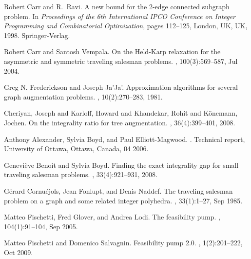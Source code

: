 \documentclass[runningheads]{llncs}
\begin{document}
%
%
%
% 
% 
%
\begin{thebibliography}{10}
	
	
	
	Robert Carr and R.~Ravi.
	\newblock A new bound for the 2-edge connected subgraph problem.
	\newblock In {\em Proceedings of the 6th International IPCO Conference on
		Integer Programming and Combinatorial Optimization}, pages 112--125, London,
	UK, UK, 1998. Springer-Verlag.
	
	Robert Carr and Santosh Vempala.
	\newblock On the {H}eld-{K}arp relaxation for the asymmetric and symmetric
	traveling salesman problems.
	, 100(3):569--587, Jul 2004.
	
	Greg N. Frederickson and Joseph Ja'Ja'.
	\newblock Approximation algorithms for several graph
	augmentation problems.
	, 10(2):270--283, 1981.
	
	Cheriyan, Joseph and Karloff, Howard and Khandekar, Rohit and K{\"o}nemann, Jochen.
	\newblock On the integrality ratio for tree augmentation.
	, 36(4):399--401, 2008.
    	
    Anthony Alexander, Sylvia Boyd, and Paul Elliott-Magwood.
    .
    \newblock Technical report, University of Ottawa, Ottawa, Canada, 04 2006.
    
    Geneviève Benoit and Sylvia Boyd.
    \newblock Finding the exact integrality gap for small traveling salesman
      problems.
    , 33(4):921--931, 2008.

	G{\'e}rard Cornu{\'e}jols, Jean Fonlupt, and Denis Naddef.
	\newblock The traveling salesman problem on a graph and some related integer
	polyhedra.
	, 33(1):1--27, Sep 1985.
	
	Matteo Fischetti, Fred Glover, and Andrea Lodi.
	\newblock The feasibility pump.
	, 104(1):91--104, Sep 2005.
	
	Matteo Fischetti and Domenico Salvagnin.
	\newblock Feasibility pump 2.0.
	, 1(2):201--222, Oct 2009.
	

\end{thebibliography}
\end{document}
